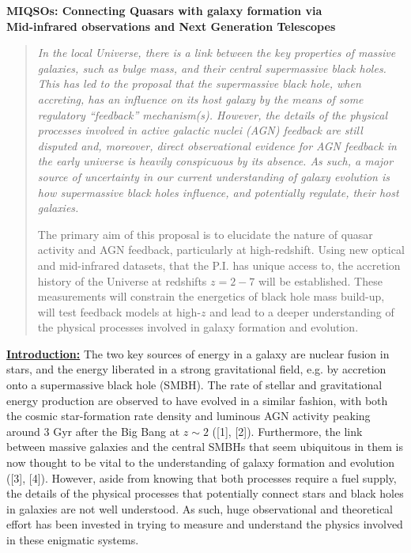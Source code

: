 \documentclass[oneside, a4paper, onecolumn, 11pt]{article}
\begin{document}
\begin{center}
  {\Large \bf MIQSOs: Connecting Quasars with galaxy formation via\\}
\vspace{4pt} 
  {\Large \bf Mid-infrared observations and Next Generation Telescopes}
\end{center}

\begin{quotation}
\noindent
{\it 
In the local Universe, there is a link between the key properties of
massive galaxies, such as bulge mass, and their central supermassive
black holes. This has led to the proposal that the supermassive black
hole, when accreting, has an influence on its host galaxy by the means
of some regulatory ``feedback'' mechanism(s). However, the details of
the physical processes involved in active galactic nuclei (AGN)
feedback are still disputed and, moreover, direct observational
evidence for AGN feedback in the early universe is heavily conspicuous
by its absence. As such, a major source of uncertainty in our current
understanding of galaxy evolution is how supermassive black holes
influence, and potentially regulate, their host galaxies.

\smallskip
\smallskip
\noindent
The primary aim of this proposal is to elucidate the nature of quasar
activity and AGN feedback, particularly at high-redshift. Using new
optical and mid-infrared datasets, that the P.I. has unique access to,
the accretion history of the Universe at redshifts $z=2-7$ will be established.  
These measurements will constrain the energetics of black hole mass build-up, 
will test feedback models at high-$z$ and lead to a deeper
understanding of the physical processes involved in galaxy 
formation and evolution.
}
\end{quotation}


\smallskip
\smallskip
\noindent
{\bf \underline{Introduction:}}
The two key sources of energy in a galaxy are nuclear fusion in stars,
and the energy liberated in a strong gravitational field, e.g. by
accretion onto a supermassive black hole (SMBH).
%
The rate of stellar and gravitational energy
production are observed to have evolved in a similar fashion, with
both the cosmic star-formation rate density and luminous AGN %
activity peaking around 3 Gyr after the Big Bang at $z\sim2$ ([1], [2]).
Furthermore, the link between massive galaxies and the central SMBHs
that seem ubiquitous in them is now thought to be vital to the
understanding of galaxy formation and evolution ([3], [4]).
However, aside from knowing that both processes require a fuel supply, 
the details of the physical processes that potentially
connect stars and black holes in galaxies are not well understood.
As such, huge observational and theoretical effort has been invested in
trying to measure and understand the physics involved in these
enigmatic systems.
\end{document}
